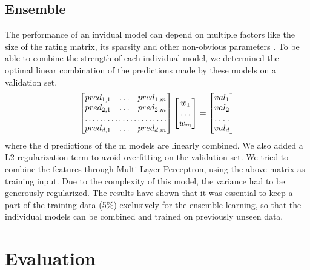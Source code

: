 \documentclass[10pt,conference,compsocconf]{IEEEtran}
\begin{document}
\subsection{Ensemble}

The performance of an invidual model can depend on multiple factors like the size of the rating matrix, its sparsity and other non-obvious parameters \cite{comparative}. 
To be able to combine the strength of each individual model, we determined the optimal linear combination of the predictions made by these models on a validation set. 
\[
\begin{bmatrix}
    pred_{1,1}  & \hdots & pred_{1,m}\\
    pred_{2,1}  & \hdots & pred_{2,m}\\
    \hdotsfor{3} \\
    pred_{d,1}  & \hdots & pred_{d,m}
\end{bmatrix}
\begin{bmatrix}
    w_{1}\\
    \hdots \\
    w_{m}\\
\end{bmatrix}
=
\begin{bmatrix}
    val_{1}\\
    val_{2}\\
    \hdotsfor{1} \\
    val_{d}
\end{bmatrix}
\]
where the d predictions of the m models are linearly combined. We also added a L2-regularization term to avoid overfitting on the validation set. 
\newline
We tried to combine the features through Multi Layer Perceptron, using the above matrix as training input. Due to the complexity of this model, the variance had to be generously regularized. 
\newline
The results have shown that it was essential to keep a part of the training data (5\%) exclusively for the ensemble learning, so that the individual models can be combined and trained on previously unseen data.


\section{Evaluation}
\label{res}
\end{document}
